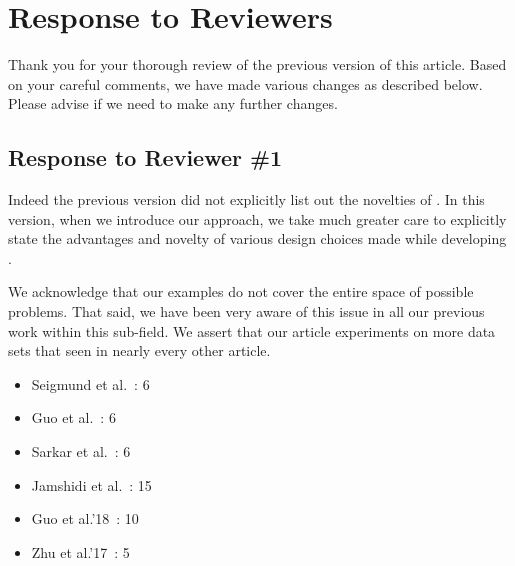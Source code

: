 \clearpage
\section*{Response to Reviewers}

Thank you for your thorough review of the previous version of this article.
Based on your careful comments, we have made various changes as described below. Please
advise if we need to make any further changes.


\subsection*{Response to Reviewer \#1}


Indeed the previous version did not explicitly list out the novelties of \flash. In this version, when we introduce our approach, 
we take much greater care to  explicitly state the advantages and novelty of various design choices made while developing \flash. 


We acknowledge that our examples do not cover the entire space of possible problems. That said, we have been very aware of this issue in all our previous work within this sub-field. We assert that our article experiments  on more data sets that seen in nearly every other article.

\begin{itemize}
    \item Seigmund et al.~\cite{siegmund2012predicting}: 6
    \item Guo et al.~\cite{guo2013variability}: 6
    \item Sarkar et al.~\cite{sarkar2015cost}: 6
    \item Jamshidi et al.~\cite{jamshidi2016uncertainty}: 15
    \item Guo et al.’18~\cite{guo2017data}: 10
    \item Zhu et al.'17~\cite{zhu2017bestconfig}: 5 
\end{itemize}



